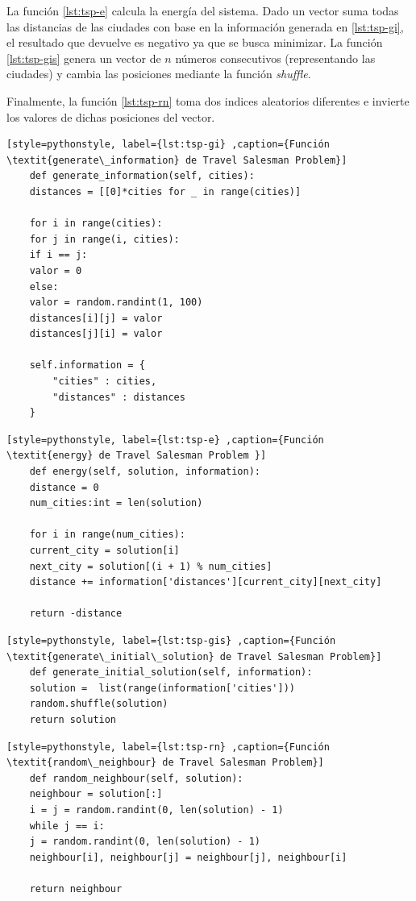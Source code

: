 La función \ref{lst:tsp-e} calcula la energía del sistema. Dado un vector suma todas las distancias de las ciudades con base en la información generada en \ref{lst:tsp-gi}, el resultado que devuelve es negativo ya que se busca minimizar. La función \ref{lst:tsp-gis} genera un vector de $n$ números consecutivos (representando las ciudades) y cambia las posiciones mediante la función \textit{shuffle}.

Finalmente, la función \ref{lst:tsp-rn} toma dos indices aleatorios diferentes e invierte los valores de dichas posiciones del vector.

\begin{lstlisting}[style=pythonstyle, label={lst:tsp-gi} ,caption={Función \textit{generate\_information} de Travel Salesman Problem}]
	def generate_information(self, cities):
	distances = [[0]*cities for _ in range(cities)]
	
	for i in range(cities):
	for j in range(i, cities):  
	if i == j:
	valor = 0  
	else:
	valor = random.randint(1, 100)
	distances[i][j] = valor
	distances[j][i] = valor 
	
	self.information = {
		"cities" : cities,
		"distances" : distances
	}
\end{lstlisting}

\begin{lstlisting}[style=pythonstyle, label={lst:tsp-e} ,caption={Función \textit{energy} de Travel Salesman Problem }]
	def energy(self, solution, information):
	distance = 0
	num_cities:int = len(solution)
	
	for i in range(num_cities):
	current_city = solution[i]
	next_city = solution[(i + 1) % num_cities]  
	distance += information['distances'][current_city][next_city]
	
	return -distance
\end{lstlisting}

\begin{lstlisting}[style=pythonstyle, label={lst:tsp-gis} ,caption={Función \textit{generate\_initial\_solution} de Travel Salesman Problem}]
	def generate_initial_solution(self, information):
	solution =  list(range(information['cities']))
	random.shuffle(solution)
	return solution     
\end{lstlisting}

\begin{lstlisting}[style=pythonstyle, label={lst:tsp-rn} ,caption={Función \textit{random\_neighbour} de Travel Salesman Problem}]
	def random_neighbour(self, solution):
	neighbour = solution[:]
	i = j = random.randint(0, len(solution) - 1)
	while j == i:
	j = random.randint(0, len(solution) - 1)
	neighbour[i], neighbour[j] = neighbour[j], neighbour[i]
	
	return neighbour
\end{lstlisting}

